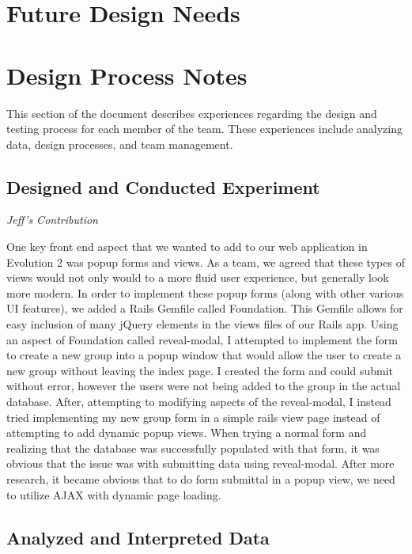 \documentclass[11pt]{article}
\begin{document}
\section{Future Design Needs}

\section{Design Process Notes}

This section of the document describes experiences regarding the design and testing process for each member of the team.  These experiences include analyzing data, design processes, and team management.

\subsection{Designed and Conducted Experiment}

\textit{Jeff's Contribution}

One key front end aspect that we wanted to add to our web application in Evolution 2 was popup forms and views.  As a team, we agreed that these types of views would not only would to a more fluid user experience, but generally look more modern.  In order to implement these popup forms (along with other various UI features), we added a Rails Gemfile called Foundation.  This Gemfile allows for easy inclusion of many jQuery elements in the views files of our Rails app.  Using an aspect of Foundation called reveal-modal, I attempted to implement the form to create a new group into a popup window that would allow the user to create a new group without leaving the index page.  I created the form and could submit without error, however the users were not being added to the group in the actual database.  After, attempting to modifying aspects of the reveal-modal, I instead tried implementing my new group form in a simple rails view page instead of attempting to add dynamic popup views.  When trying a normal form and realizing that the database was successfully populated with that form, it was obvious that the issue was with submitting data using reveal-modal.  After more research, it became obvious that to do form submittal in a popup view, we need to utilize AJAX with dynamic page loading.

\subsection{Analyzed and Interpreted Data}
\end{document}
